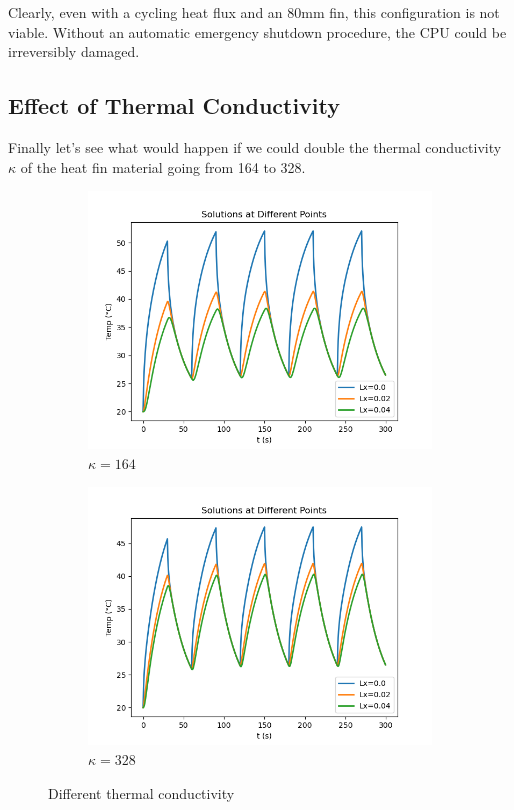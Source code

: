 \documentclass{article}
\begin{document}
Clearly, even with a cycling heat flux and an 80mm fin, this configuration is not viable. Without an automatic emergency shutdown procedure, the CPU could be irreversibly damaged.

\subsection{Effect of Thermal Conductivity }
Finally let's see what would happen if we could double the thermal conductivity $\kappa$ of the heat fin material going from 164 to 328.

\begin{figure}[H]
\begin{subfigure}{.5\textwidth}
  \centering
  \includegraphics[width=1\linewidth]{images/k164.png}
  \caption{$\kappa=164$}
  \label{fig:sfig1}
\end{subfigure}
\begin{subfigure}{.5\textwidth}
  \centering
  \includegraphics[width=1\linewidth]{images/k328.png}
  \caption{$\kappa=328$}
\end{subfigure}
\caption{Different thermal conductivity}
\label{fig:fig}
\end{figure}
\end{document}
